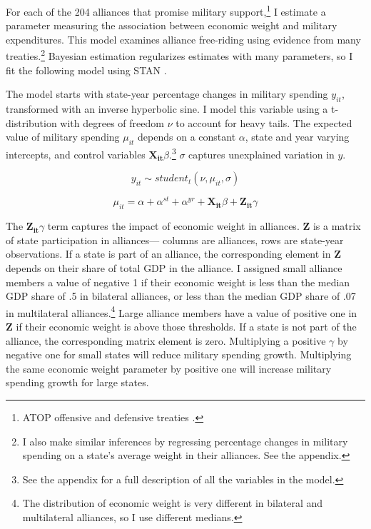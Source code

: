 \documentclass[12pt]{article}
\begin{document}
For each of the 204 alliances that promise military support,\footnote{ATOP offensive and defensive treaties \citep{Leedsetal2002}.} I estimate a parameter measuring the association between economic weight and military expenditures. 
This model examines alliance free-riding using evidence from many treaties.\footnote{I also make similar inferences by regressing percentage changes in military spending on a state's average weight in their alliances. See the appendix.}
Bayesian estimation regularizes estimates with many parameters, so I fit the following model using STAN \citep{Carpenteretal2016}.


The model starts with state-year percentage changes in military spending $y_{it}$, transformed with an inverse hyperbolic sine.
I model this variable using a t-distribution with degrees of freedom $\nu$ to account for heavy tails.
The expected value of military spending $\mu_{it}$ depends on a constant $\alpha$, state and year varying intercepts, and control variables $\mathbf{X_{it}} \beta$.\footnote{See the appendix for a full description of all the variables in the model.} 
$\sigma$ captures unexplained variation in $y$. 

\begin{equation}
y_{it} \sim student_t(\nu, \mu_{it}, \sigma) 
\end{equation}

\begin{equation}
\mu_{it} = \alpha + \alpha^{st} + \alpha^{yr} + \mathbf{X_{it}} \beta + \mathbf{Z_{it}} \gamma
\end{equation}


The $\mathbf{Z_{it}} \gamma$ term captures the impact of economic weight in alliances.  
$\textbf{Z}$ is a matrix of state participation in alliances--- columns are alliances, rows are state-year observations.  
If a state is part of an alliance, the corresponding element in $\textbf{Z}$ depends on their share of total GDP in the alliance. 
I assigned small alliance members a value of negative 1 if their economic weight is less than the median GDP share of .5 in bilateral alliances, or less than the median GDP share of .07 in multilateral alliances.\footnote{The distribution of economic weight is very different in bilateral and multilateral alliances, so I use different medians.}
Large alliance members have a value of positive one in $\textbf{Z}$ if their economic weight is above those thresholds. 
If a state is not part of the alliance, the corresponding matrix element is zero. 
Multiplying a positive $\gamma$ by negative one for small states will reduce military spending growth.
Multiplying the same economic weight parameter by positive one will increase military spending growth for large states. 
\end{document}

